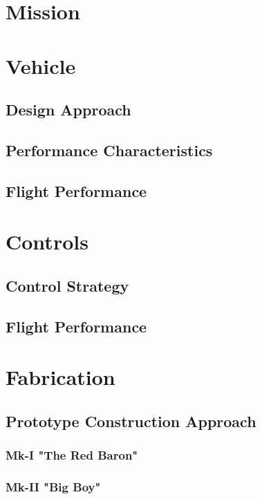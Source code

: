\documentclass[11pt]{article}
\begin{document}
\section{Mission}
\label{Mission}

\section{Vehicle}
\label{Vehicle}
\subsection{Design Approach}
\label{DsignAppr}
\subsection{Performance Characteristics}
\label{PerfChar}
\subsection{Flight Performance}
\label{AeroFlightPerf}


\section{Controls}
\label{Controls}
\subsection{Control Strategy}
\label{CtrlStr}
\subsection{Flight Performance}
\label{CtrlFlightPerf}


\section{Fabrication}
\label{Fabrication}
\subsection{Prototype Construction Approach}
\label{ProtoConsAppr}
\subsubsection{Mk-I "The Red Baron"}
\label{mk1}
\subsubsection{Mk-II "Big Boy"}
\label{mk2}
\end{document}

